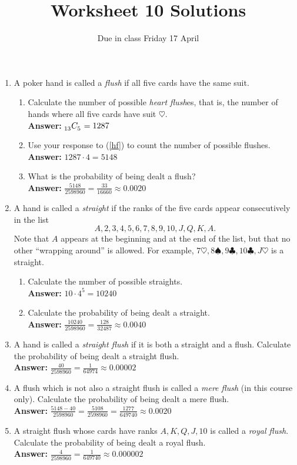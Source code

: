 \documentclass[12pt]{article}
\author{}\date{Due in class Friday 17 April}
\title{Worksheet 10 Solutions}\author{}
\newcommand\ncr[2]{\tensor[_{#1}]C{_{#2}}}
\begin{document}
\maketitle
\thispagestyle{empty}
\begin{enumerate}

\item A poker hand is called a {\em flush} if all five cards
have the same suit.
\begin{enumerate}
\item\label{hf} Calculate the number of possible {\em heart flush}es,
that is, the number of hands where all five cards have suit $\heartsuit$.\\
{\bf Answer:} $\ncr{13}{5}=1287$
\item Use your response to (\ref{hf}) to count the number of
possible flushes.\\
{\bf Answer:} $1287\cdot 4=5148$
\item What is the probability of being dealt a flush?\\
{\bf Answer:} $\frac{5148}{2598960}
=\frac{33}{16660}\approx 0.0020$
\end{enumerate}
\item A hand is called a {\em straight} if the ranks of the five
cards appear consecutively in the list
\[A,2,3,4,5,6,7,8,9,10,J,Q,K,A.\]
Note that $A$ appears at the beginning and at the end of the list, but
that no other ``wrapping around'' is allowed.
For example, $7\heartsuit,8\spadesuit,9\clubsuit,10\clubsuit,J\heartsuit$
is a straight.
\begin{enumerate}
\item Calculate the number of possible straights.\\
{\bf Answer:} $10\cdot 4^5=10240$
\item Calculate the probability of being dealt a straight.\\
{\bf Answer:}
$\frac{10240}{2598960}=\frac{128}{32487}\approx 0.0040$
\end{enumerate}

\item A hand is called a {\em straight flush} if it is both
a straight and a flush. Calculate the probability of being dealt
a straight flush.\\
{\bf Answer:}
$\frac{40}{2598960}=\frac{1}{64974}\approx 0.00002$

\item A flush which is not also a straight flush is called a {\em mere flush}
(in this course only).
Calculate the probability of being dealt a mere flush.\\
{\bf Answer:}
$\frac{5148-40}{2598960}
=\frac{5108}{2598960}
=\frac{1277}{649740}\approx 0.0020$

\item A straight flush whose cards have ranks $A,K,Q,J,10$ is called
a {\em royal flush}. 
Calculate the probability of being dealt a royal flush.\\
{\bf Answer:}
$\frac{4}{2598960}=\frac{1}{649740}\approx 0.000002$
\end{enumerate}
\end{document}
